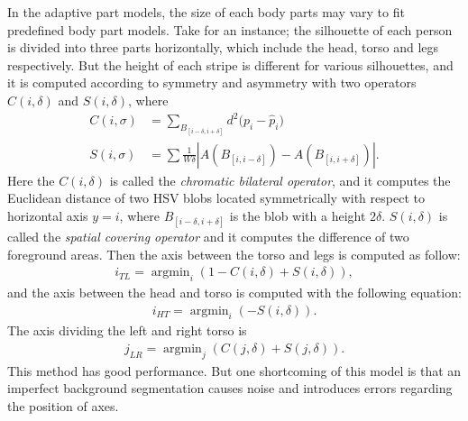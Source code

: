 In the adaptive part models, the size of each body parts may vary to fit predefined body part models. Take \cite{SDALF} for an instance; the silhouette of each person is divided into three parts horizontally, which include the head, torso and legs respectively. But the height of each stripe is different for various silhouettes, and it is computed according to symmetry and asymmetry with two operators $C(i, \delta)$ and $S(i,\delta)$, where 
\begin{equation}
\begin{aligned}
C(i,\sigma) & = \sum_{B_{[i-\delta, i+\delta]}}{d^2(p_i-{\hat{p}_i)}} \\
S(i,\sigma) &= \sum{\frac{1}{W\delta}|A(B_{[i,i-\delta]}) - A(B_{[i,i+\delta]})|}.
\end{aligned}
\end{equation}
Here the $C(i, \delta)$ is called the \emph{chromatic bilateral operator}, and it computes the Euclidean distance of two HSV blobs located symmetrically with respect to horizontal axis $y = i$, where $B_{[i-\delta, i+\delta]}$ is the blob with a height $2\delta$. $S(i,\delta)$ is called the \emph{spatial covering operator} and it computes the difference of two foreground areas. Then the axis between the torso and legs is computed as follow:
\begin{equation}
\begin{aligned}
i_{TL} = \mathop{\arg\min}_i(1-C(i,\delta)+S(i,\delta)),
\end{aligned}
\end{equation}
and the axis  between the head and torso is computed with the following equation:
\begin{equation}
\begin{aligned}
i_{HT} = \mathop{\arg\min}_i(-S(i,\delta)).
\end{aligned}
\end{equation}
The axis dividing the left and right torso is
\begin{equation}
\begin{aligned}
j_{LR} = \mathop{\arg\min}_j(C(j,\delta)+S(j,\delta)).
\end{aligned}
\end{equation}
This method has good performance. But one shortcoming of this model is that an imperfect background segmentation causes noise and introduces errors regarding the position of axes. \\
